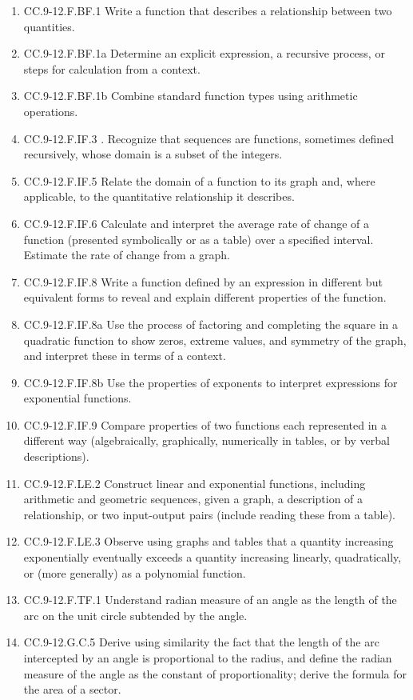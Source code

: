 \begin{enumerate}
	\item CC.9-12.F.BF.1 Write a function that describes a relationship between two quantities.
	\item CC.9-12.F.BF.1a Determine an explicit expression, a recursive process, or steps for calculation from a context. 
	\item CC.9-12.F.BF.1b Combine standard function types using arithmetic operations. 
	\item CC.9-12.F.IF.3 . Recognize that sequences are functions, sometimes defined recursively, whose domain is a subset of the integers. 
	\item CC.9-12.F.IF.5  Relate the domain of a function to its graph and, where applicable, to the quantitative relationship it describes.
	\item CC.9-12.F.IF.6   Calculate and interpret the average rate of change of a function (presented symbolically or as a table) over a specified interval. Estimate the rate of change from a graph.
	\item CC.9-12.F.IF.8  Write a function defined by an expression in different but equivalent forms to reveal and explain different properties of the function. 
	\item CC.9-12.F.IF.8a Use the process of factoring and completing the square in a quadratic function to show zeros, extreme values, and symmetry of the graph, and interpret these in terms of a context. 
	\item CC.9-12.F.IF.8b Use the properties of exponents to interpret expressions for exponential functions. 
	\item CC.9-12.F.IF.9 Compare properties of two functions each represented in a different way (algebraically, graphically, numerically in tables, or by verbal descriptions).
	\item CC.9-12.F.LE.2  Construct linear and exponential functions, including arithmetic and geometric sequences, given a graph, a description of a relationship, or two input-output pairs (include reading these from a table).
	\item CC.9-12.F.LE.3  Observe using graphs and tables that a quantity increasing exponentially eventually exceeds a quantity increasing linearly, quadratically, or (more generally) as a polynomial function.
	\item CC.9-12.F.TF.1 Understand radian measure of an angle as the length of the arc on the unit circle subtended by the angle.
	\item CC.9-12.G.C.5  Derive using similarity the fact that the length of the arc intercepted by an angle is proportional to the radius, and define the radian measure of the angle as the constant of proportionality; derive the formula for the area of a sector.

\end{enumerate}
